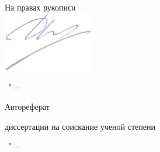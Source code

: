 \thispagestyle{empty}

\vspace{0pt plus1fill} %
\begin{flushright}
  \large{На правах рукописи}\\\vskip5pt
  \includegraphics[height=2.6cm]{../images/my_signature} 
\end{flushright}
\vspace{-\baselineskip}
\vspace{-\baselineskip}

\vspace{0pt plus3fill} %
\begin{center}
\large\bf \thesisAuthor
\end{center}

\vspace{0pt plus3fill} %
\begin{center}
\baselineskip=1.0cm
\textbf {\large \thesisTitle}

\vspace{0pt plus3fill} %
{\large \thesisSpecialtyNumber\ "---\par \thesisSpecialtyTitle}

\vspace{0pt plus1.5fill} %
\large{Автореферат}\par
\large{диссертации на соискание ученой степени\par \thesisDegree}
\end{center}

\vspace{0pt plus4fill} %
\begin{center}
{\large{\thesisCity\ "--- \thesisYear}}
\end{center}


